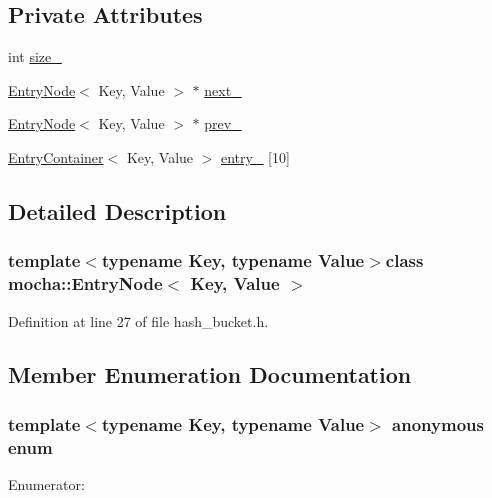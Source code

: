 \subsection*{Private Attributes}
\begin{DoxyCompactItemize}
\item 
int \hyperlink{classmocha_1_1_entry_node_a84d128dc83eceffa42600fbb157035a6}{size\_\-}
\item 
\hyperlink{classmocha_1_1_entry_node}{EntryNode}$<$ Key, Value $>$ $\ast$ \hyperlink{classmocha_1_1_entry_node_a5ac0f7dac781153119c25a6f43b6621a}{next\_\-}
\item 
\hyperlink{classmocha_1_1_entry_node}{EntryNode}$<$ Key, Value $>$ $\ast$ \hyperlink{classmocha_1_1_entry_node_ab0f8182df8e4e1bf8d297aa730bcd51a}{prev\_\-}
\item 
\hyperlink{classmocha_1_1_entry_container}{EntryContainer}$<$ Key, Value $>$ \hyperlink{classmocha_1_1_entry_node_aaff09614e453f1d5407bf8557a525962}{entry\_\-} \mbox{[}10\mbox{]}
\end{DoxyCompactItemize}


\subsection{Detailed Description}
\subsubsection*{template$<$typename Key, typename Value$>$class mocha::EntryNode$<$ Key, Value $>$}



Definition at line 27 of file hash\_\-bucket.h.



\subsection{Member Enumeration Documentation}
\hypertarget{classmocha_1_1_entry_node_a903ff829823f6d2ffc816134b685d249}{
\subsubsection[{"@23}]{\setlength{\rightskip}{0pt plus 5cm}template$<$typename Key, typename Value$>$ anonymous enum}}
\label{classmocha_1_1_entry_node_a903ff829823f6d2ffc816134b685d249}
\begin{Desc}
\item[Enumerator: ]\par
\begin{description}
\item[{\em 
\hypertarget{classmocha_1_1_entry_node_a903ff829823f6d2ffc816134b685d249a0dc13ddec2296670a5855615141bf99c}{
kMax}
\label{classmocha_1_1_entry_node_a903ff829823f6d2ffc816134b685d249a0dc13ddec2296670a5855615141bf99c}
}]\end{description}
\end{Desc}



